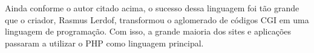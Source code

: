 Ainda conforme o autor citado acima, o sucesso dessa linguagem foi tão grande que o criador, Rasmus Lerdof, transformou o aglomerado de códigos CGI em uma linguagem de programação. Com isso, a grande maioria dos sites e aplicações passaram a utilizar o PHP como linguagem principal.

